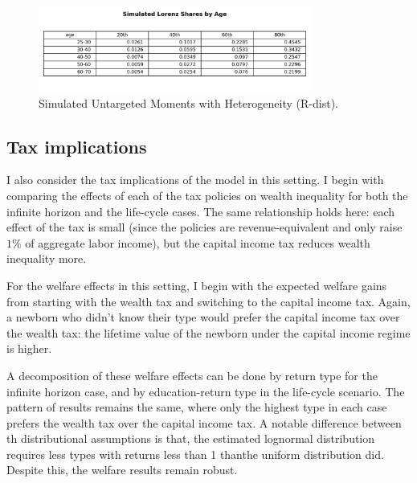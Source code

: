 \begin{figure}[htbp]
\centering
\includegraphics[width=0.8\textwidth]{Tables/Sim_Lorenz_by_age_Lognorm_LCrrDistNetWorth_2004.png}
\caption{Simulated Untargeted Moments with Heterogeneity (R-dist).}
\label{fig:SimLorenzTarDist}
\end{figure}

\subsection{Tax implications}

\par I also consider the tax implications of the model in this setting. I begin with comparing the effects of each of the tax policies on wealth inequality for both the infinite horizon and the life-cycle cases. The same relationship holds here: each effect of the tax is small (since the policies are revenue-equivalent and only raise $1\%$ of aggregate labor income), but the capital income tax reduces wealth inequality more.

\unskip
\unskip

\par For the welfare effects in this setting, I begin with the expected welfare gains from starting with the wealth tax and switching to the capital income tax. Again, a newborn who didn't know their type would prefer the capital income tax over the wealth tax: the lifetime value of the newborn under the capital income regime is higher. 



\par A decomposition of these welfare effects can be done by return type for the infinite horizon case, and by education-return type in the life-cycle scenario. The pattern of results remains the same, where only the highest type in each case prefers the wealth tax over the capital income tax. A notable difference between th distributional assumptions is that, the estimated lognormal distribution requires less types with returns less than 1 thanthe uniform distribution did. Despite this, the welfare results remain robust. 

